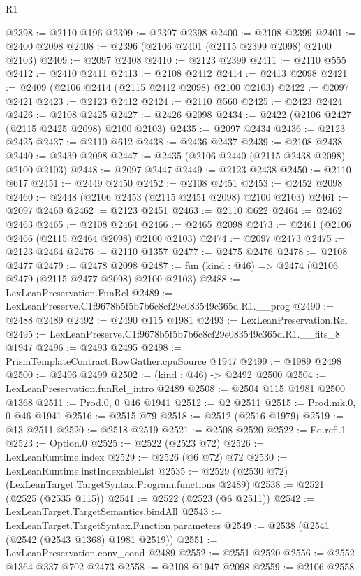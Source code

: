 \begin{lexlean}{R1}
\begin{coremodule}
@2398 := @2110 @196
@2399 := @2397 @2398
@2400 := @2108 @2399
@2401 := @2400 @2098
@2408 := @2396 (@2106 @2401 (@2115 @2399 @2098) @2100 @2103)
@2409 := @2097 @2408
@2410 := @2123 @2399
@2411 := @2110 @555
@2412 := @2410 @2411
@2413 := @2108 @2412
@2414 := @2413 @2098
@2421 := @2409 (@2106 @2414 (@2115 @2412 @2098) @2100 @2103)
@2422 := @2097 @2421
@2423 := @2123 @2412
@2424 := @2110 @560
@2425 := @2423 @2424
@2426 := @2108 @2425
@2427 := @2426 @2098
@2434 := @2422 (@2106 @2427 (@2115 @2425 @2098) @2100 @2103)
@2435 := @2097 @2434
@2436 := @2123 @2425
@2437 := @2110 @612
@2438 := @2436 @2437
@2439 := @2108 @2438
@2440 := @2439 @2098
@2447 := @2435 (@2106 @2440 (@2115 @2438 @2098) @2100 @2103)
@2448 := @2097 @2447
@2449 := @2123 @2438
@2450 := @2110 @617
@2451 := @2449 @2450
@2452 := @2108 @2451
@2453 := @2452 @2098
@2460 := @2448 (@2106 @2453 (@2115 @2451 @2098) @2100 @2103)
@2461 := @2097 @2460
@2462 := @2123 @2451
@2463 := @2110 @622
@2464 := @2462 @2463
@2465 := @2108 @2464
@2466 := @2465 @2098
@2473 := @2461 (@2106 @2466 (@2115 @2464 @2098) @2100 @2103)
@2474 := @2097 @2473
@2475 := @2123 @2464
@2476 := @2110 @1357
@2477 := @2475 @2476
@2478 := @2108 @2477
@2479 := @2478 @2098
@2487 := fun (kind : @46) => @2474 (@2106 @2479 (@2115 @2477 @2098) @2100 @2103)
@2488 := LexLeanPreservation.FunRel
@2489 := LexLeanPreserve.C1f9678b5f5b7b6c8cf29e083549c365d.R1.__prog
@2490 := @2488 @2489
@2492 := @2490 @115 @1981
@2493 := LexLeanPreservation.Rel
@2495 := LexLeanPreserve.C1f9678b5f5b7b6c8cf29e083549c365d.R1.__fits_8 @1947
@2496 := @2493 @2495
@2498 := PrismTemplateContract.RowGather.cpuSource @1947
@2499 := @1989 @2498
@2500 := @2496 @2499
@2502 := (kind : @46) -> @2492 @2500
@2504 := LexLeanPreservation.funRel_intro @2489
@2508 := @2504 @115 @1981 @2500 @1368
@2511 := Prod.{0, 0} @46 @1941
@2512 := @2 @2511
@2515 := Prod.mk.{0, 0} @46 @1941
@2516 := @2515 @79
@2518 := @2512 (@2516 @1979)
@2519 := @13 @2511
@2520 := @2518 @2519
@2521 := @2508 @2520
@2522 := Eq.refl.{1}
@2523 := Option.{0}
@2525 := @2522 (@2523 @72)
@2526 := LexLeanRuntime.index
@2529 := @2526 (@6 @72) @72
@2530 := LexLeanRuntime.instIndexableList
@2535 := @2529 (@2530 @72) (LexLeanTarget.TargetSyntax.Program.functions @2489)
@2538 := @2521 (@2525 (@2535 @115))
@2541 := @2522 (@2523 (@6 @2511))
@2542 := LexLeanTarget.TargetSemantics.bindAll
@2543 := LexLeanTarget.TargetSyntax.Function.parameters
@2549 := @2538 (@2541 (@2542 (@2543 @1368) @1981 @2519))
@2551 := LexLeanPreservation.conv_cond @2489
@2552 := @2551 @2520
@2556 := @2552 @1364 @337 @702 @2473
@2558 := @2108 @1947 @2098
@2559 := @2106 @2558

\end{coremodule}
\end{lexlean}
